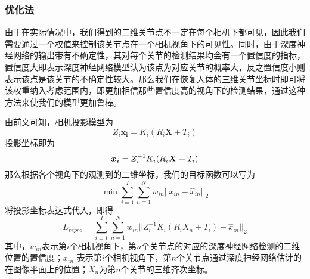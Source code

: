 \subsubsection{优化法}
由于在实际情况中，我们得到的二维关节点不一定在每个相机下都可见，因此我们需要通过一个权值来控制该关节点在一个相机视角下的可见性。同时，由于深度神经网络的输出带有不确定性，其对每个关节的检测结果均会有一个置信度的指标，置信度大即表示深度神经网络模型认为该点为对应关节的概率大，反之置信度小则表示该点是该关节的不确定性较大。那么我们在恢复人体的三维关节坐标时即可将该权重纳入考虑范围内，即更加相信那些置信度高的视角下的检测结果，通过这种方法来使我们的模型更加鲁棒。

由前文可知，相机投影模型为
\begin{equation}
    Z_i \bm{x_i} = K_i(R_i\bm{X} + T_i)
\end{equation}
投影坐标即为
\begin{equation}
    \bm{x_i} = Z_i^{-1}K_i(R_i{\bm{X}} + T_i)
\end{equation}
那么根据各个视角下的观测到的二维坐标，我们的目标函数可以写为
\begin{equation}
    \min \sum^I_{i=1} \sum_{n=1}^N w_{in}||x_{in} - \hat x_{in}||_2
\end{equation}
将投影坐标表达式代入，即得
\begin{equation}
    L_{repro} = \sum^I_{i=1} \sum_{n=1}^N w_{in}||Z_i^{-1}K_i(R_iX_n + T_i) - \hat x_{in}||_2
\end{equation}
\newcommand{\mi}{第\(i\)个}
\newcommand{\mn}{第\(n\)个}
其中，$w_{in}$表示\mi 相机视角下，\mn 关节点的对应的深度神经网络检测的二维位置的置信度；$\hat x_{in}$ 表示\mi 相机视角下，\mn 关节点通过深度神经网络估计的在图像平面上的位置；$X_n$为\mn 关节的三维齐次坐标。

